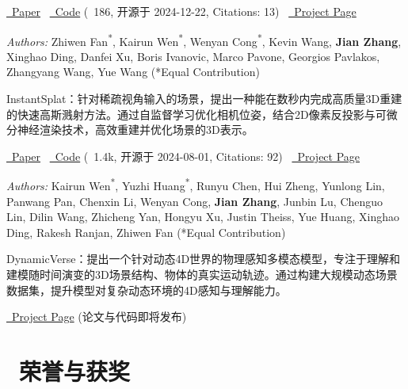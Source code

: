 \documentclass{resume}
\begin{document}
\href{https://arxiv.org/abs/2410.18956}{\faFileTextO\ Paper} \textperiodcentered\ \href{https://github.com/NVlabs/LSM}{\faCode\ Code} (\faStar\ 186, 开源于 2024-12-22, Citations: 13) \textperiodcentered\ \href{https://largespatialmodel.github.io/}{\faGlobe\ Project Page}

\textit{Authors:} Zhiwen Fan\textsuperscript{*}, Kairun Wen\textsuperscript{*}, Wenyan Cong\textsuperscript{*}, Kevin Wang, \textbf{Jian Zhang}, Xinghao Ding, Danfei Xu, Boris Ivanovic, Marco Pavone, Georgios Pavlakos, Zhangyang Wang, Yue Wang (*Equal Contribution)

InstantSplat：针对稀疏视角输入的场景，提出一种能在数秒内完成高质量3D重建的快速高斯溅射方法。通过自监督学习优化相机位姿，结合2D像素反投影与可微分神经渲染技术，高效重建并优化场景的3D表示。

\href{https://arxiv.org/abs/2403.20309}{\faFileTextO\ Paper} \textperiodcentered\ \href{https://github.com/NVlabs/InstantSplat}{\faCode\ Code} (\faStar\ 1.4k, 开源于 2024-08-01, Citations: 92) \textperiodcentered\ \href{https://instantsplat.github.io/}{\faGlobe\ Project Page}

\textit{Authors:} Kairun Wen\textsuperscript{*}, Yuzhi Huang\textsuperscript{*}, Runyu Chen, Hui Zheng, Yunlong Lin, Panwang Pan, Chenxin Li, Wenyan Cong, \textbf{Jian Zhang}, Junbin Lu, Chenguo Lin, Dilin Wang, Zhicheng Yan, Hongyu Xu, Justin Theiss, Yue Huang, Xinghao Ding, Rakesh Ranjan, Zhiwen Fan (*Equal Contribution)

DynamicVerse：提出一个针对动态4D世界的物理感知多模态模型，专注于理解和建模随时间演变的3D场景结构、物体的真实运动轨迹。通过构建大规模动态场景数据集，提升模型对复杂动态环境的4D感知与理解能力。

\href{https://dynamic-verse.github.io/}{\faGlobe\ Project Page} (论文与代码即将发布)

\section{\faHeartO\ 荣誉与获奖}



%
%
\end{document}
